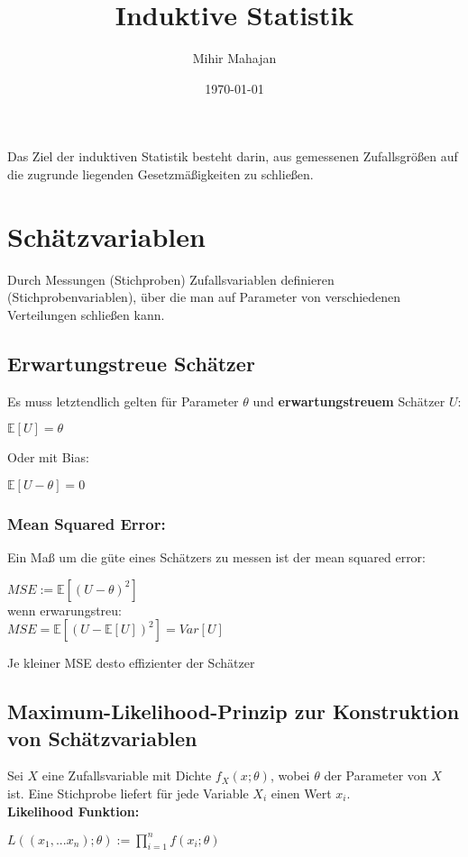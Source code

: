 \documentclass[11pt]{article}
\author{Mihir Mahajan}
\date{\today}
\title{Induktive Statistik}
\begin{document}
\maketitle
\tableofcontents

Das Ziel der induktiven Statistik besteht darin, aus gemessenen Zufallsgrößen auf die zugrunde liegenden Gesetzmäßigkeiten zu schließen.

\section{Schätzvariablen}
\label{sec:org0ae778e}
Durch Messungen (Stichproben) Zufallsvariablen definieren (Stichprobenvariablen), über die man auf Parameter von verschiedenen Verteilungen schließen kann.
\subsection{Erwartungstreue Schätzer}
\label{sec:org46a273f}
Es muss letztendlich gelten für Parameter \(\theta\) und \textbf{erwartungstreuem} Schätzer \(U\):
\begin{center}
\(\mathbb{E}[U] = \theta\)
\end{center}
Oder mit Bias:
\begin{center}
\(\mathbb{E}[U- \theta] = 0\)
\end{center}

\subsubsection{Mean Squared Error:}
\label{sec:orgc0a3d57}
Ein Maß um die güte eines Schätzers zu messen ist der mean squared error:
\begin{center}
\(MSE := \mathbb{E}[(U- \theta)^2]\) \\
wenn erwarungstreu: \\
\(MSE = \mathbb{E}[(U- \mathbb{E}[U])^2] = Var[U]\) \\
\end{center}
Je kleiner MSE desto effizienter der Schätzer

\subsection{Maximum-Likelihood-Prinzip zur Konstruktion von Schätzvariablen}
\label{sec:org48d3ce3}
Sei \(X\) eine Zufallsvariable mit Dichte \(f_X(x;\theta)\), wobei \(\theta\) der Parameter von \(X\) ist.
Eine Stichprobe liefert für jede Variable \(X_i\) einen Wert \(x_i\). \\
\textbf{Likelihood Funktion:} \\
\begin{center}
\(L((x_1,...x_n); \theta) := \prod_{i=1}^n f(x_i; \theta)\)
\end{center}
\end{document}
